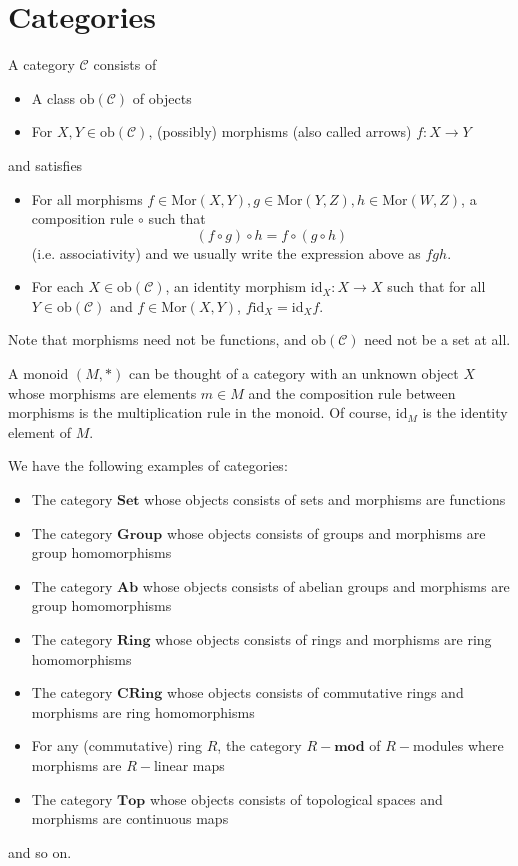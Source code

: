 \documentclass[12pt,reqno]{amsart}
\numberwithin{theorem}{section}
\theoremstyle{definition}
\theoremstyle{remark}
\numberwithin{equation}{section}
\newcommand{\cC}{\mathcal{C}}
\theoremstyle{definition}
\newcommand{\ob}{\mathrm{ob}}
\newcommand{\id}{\mathrm{id}}
\newcommand{\Mor}{\mathrm{Mor}}
\begin{document}
\section{Categories}
\begin{definition}
    A category $\cC$ consists of
    \begin{itemize}
        \item A class $\mathrm{ob}(\cC)$ of objects
        \item For $X,Y \in \ob(\cC)$, (possibly) morphisms (also called arrows) $f:X\rightarrow Y$ 
    \end{itemize}
    and satisfies
    \begin{itemize}
        \item For all morphisms $f \in \Mor(X,Y),g \in \Mor(Y,Z), h \in \Mor(W,Z)$, a composition rule $\circ$ such that
        $$(f\circ g )\circ h = f\circ (g\circ h)$$
        (i.e. associativity) and we usually write the expression above as $fgh$. 
        \item For each $X \in \ob(\cC)$, an identity morphism $\id_X : X\rightarrow X$ such that for all $Y \in \ob(\cC)$ and $f \in \Mor(X,Y)$, $f\id_X = \id_Xf$.
    \end{itemize}
\end{definition}
Note that morphisms need not be functions, and $\ob(\cC)$ need not be a set at all. 
\begin{example}
    A monoid $(M,*)$ can be thought of a category with an unknown object $X$ whose morphisms are elements $m \in M$ and the composition rule between morphisms is the multiplication rule in the monoid. Of course, $\id_M$ is the identity element of $M$.
\end{example}
\begin{example}
    We have the following examples of categories:
    \begin{itemize}
        \item The category $\mathbf{Set}$ whose objects consists of sets and morphisms are functions
        \item The category $\mathbf{Group}$ whose objects consists of groups and morphisms are group homomorphisms
        \item The category $\mathbf{Ab}$ whose objects consists of abelian groups and morphisms are group homomorphisms
        \item The category $\mathbf{Ring}$ whose objects consists of rings and morphisms are ring homomorphisms
        \item The category $\mathbf{CRing}$ whose objects consists of commutative rings and morphisms are ring homomorphisms
        \item For any (commutative) ring $R$, the category $R-\mathbf{mod}$ of $R-$modules where morphisms are $R-$linear maps
        \item The category $\mathbf{Top}$ whose objects consists of topological spaces and morphisms are continuous maps
    \end{itemize}
    and so on.
\end{example}
\end{document}
